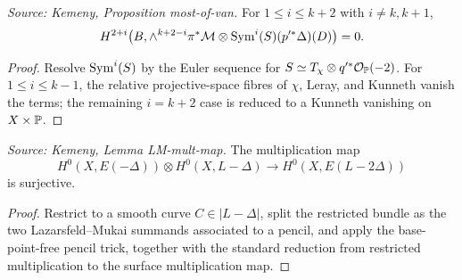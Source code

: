 \begin{proposition}
  \label{prop:kemeny_odd_most_of_vanishing}
  \textit{Source: Kemeny, Proposition most-of-van.}
  For \(1\le i\le k+2\) with \(i\ne k,k+1\),
  \[
    H^{2+i}\bigl(B,\wedge^{k+2-i}\pi^*\mathcal M\otimes
    \mathrm{Sym}^i(S)(p'^*\Delta)(D)\bigr)=0 .
  \]
\end{proposition}
\begin{proof}
  Resolve \(\mathrm{Sym}^i(S)\) by the Euler sequence for \(S\simeq T_\chi\otimes
  q'^*\mathcal{O}_{\mathbb{P}}(-2)\).  For \(1\le i\le k-1\), the relative projective-space
  fibres of \(\chi\), Leray, and Kunneth vanish the terms; the remaining
  \(i=k+2\) case is reduced to a Kunneth vanishing on \(X\times\mathbb{P}\).
\end{proof}

\begin{lemma}
  \label{lem:kemeny_LM_mult_map}
  \textit{Source: Kemeny, Lemma LM-mult-map.}
  The multiplication map
  \[
    H^0(X,E(-\Delta))\otimes H^0(X,L-\Delta)\to H^0(X,E(L-2\Delta))
  \]
  is surjective.
\end{lemma}
\begin{proof}
  Restrict to a smooth curve \(C\in|L-\Delta|\), split the restricted bundle as
  the two Lazarsfeld--Mukai summands associated to a pencil, and apply the
  base-point-free pencil trick, together with the standard reduction from
  restricted multiplication to the surface multiplication map.
\end{proof}

